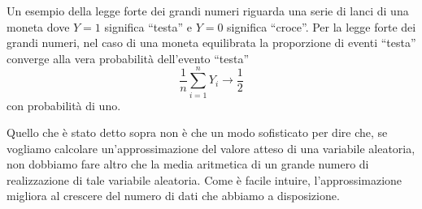 Un esempio della legge forte dei grandi numeri riguarda una serie di lanci di una moneta dove $Y=1$ significa \enquote{testa} e $Y=0$ significa \enquote{croce}. 
Per la legge forte dei grandi numeri, nel caso di una moneta equilibrata la proporzione di eventi \enquote{testa} converge alla vera probabilità dell'evento \enquote{testa} 
\[
\frac{1}{n} \sum_{i=1}^n Y_i \rightarrow \frac{1}{2}
\]
con probabilità di uno.

Quello che è stato detto sopra non è che un modo sofisticato per dire che, se vogliamo calcolare un'approssimazione del valore atteso di una variabile aleatoria, non dobbiamo fare altro che la media aritmetica di un grande numero di realizzazione di tale variabile aleatoria.
Come è facile intuire, l'approssimazione migliora al crescere del numero di dati che abbiamo a disposizione.



